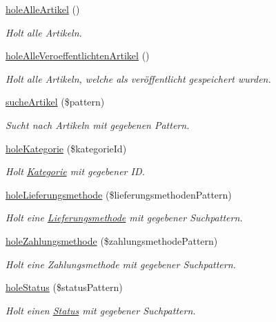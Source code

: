 \begin{DoxyCompactItemize}
\hyperlink{classDatabaseModel_ada4e7c182aa3b00d684965e8392d02ee}{hole\-Alle\-Artikel} ()
\begin{DoxyCompactList}\small\item\em \-Holt alle \-Artikeln. \end{DoxyCompactList}\item 
\hyperlink{classDatabaseModel_a000ed757760b588d6998ef5c180df34f}{hole\-Alle\-Veroeffentlichten\-Artikel} ()
\begin{DoxyCompactList}\small\item\em \-Holt alle \-Artikeln, welche als veröffentlicht gespeichert wurden. \end{DoxyCompactList}\item 
\hyperlink{classDatabaseModel_ac2dc51ab0cc99eef20d02b1945ef740b}{suche\-Artikel} (\$pattern)
\begin{DoxyCompactList}\small\item\em \-Sucht nach \-Artikeln mit gegebenen \-Pattern. \end{DoxyCompactList}\item 
\hyperlink{classDatabaseModel_a05660ada8d2113d1a2f886de27017638}{hole\-Kategorie} (\$kategorie\-Id)
\begin{DoxyCompactList}\small\item\em \-Holt \hyperlink{classKategorie}{\-Kategorie} mit gegebener \-I\-D. \end{DoxyCompactList}\item 
\hyperlink{classDatabaseModel_a233a6064cc83947926f5534f3b2ad145}{hole\-Lieferungsmethode} (\$lieferungsmethoden\-Pattern)
\begin{DoxyCompactList}\small\item\em \-Holt eine \hyperlink{classLieferungsmethode}{\-Lieferungsmethode} mit gegebener \-Suchpattern. \end{DoxyCompactList}\item 
\hyperlink{classDatabaseModel_a7c7ac6b9730d97d09c67f01e013d14d6}{hole\-Zahlungsmethode} (\$zahlungsmethode\-Pattern)
\begin{DoxyCompactList}\small\item\em \-Holt eine \-Zahlungsmethode mit gegebener \-Suchpattern. \end{DoxyCompactList}\item 
\hyperlink{classDatabaseModel_acbbf506e57f6001432bcca18cf2c39f7}{hole\-Status} (\$status\-Pattern)
\begin{DoxyCompactList}\small\item\em \-Holt einen \hyperlink{classStatus}{\-Status} mit gegebener \-Suchpattern. \end{DoxyCompactList}\item 

\end{DoxyCompactItemize}
